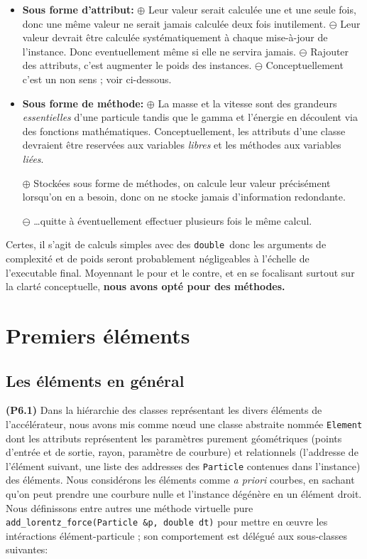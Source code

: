 \documentclass[12pt, letterpaper, twoside]{article}
\newcommand{\T}[1]{\texttt{#1}}
\newcommand{\double}{\texttt{double}}
\begin{document}
\begin{itemize}

\item \textbf{Sous forme d'attribut:}
\subitem $\oplus$ Leur valeur serait calculée une et une seule fois, donc une même valeur ne serait jamais calculée deux fois inutilement.
\subitem $\ominus$ Leur valeur devrait être calculée systématiquement à chaque mise-à-jour de l'instance. Donc eventuellement même si elle ne servira jamais.
\subitem $\ominus$ Rajouter des attributs, c'est augmenter le poids des instances.
\subitem $\ominus$ Conceptuellement c'est un non sens ; voir ci-dessous.

\item \textbf{Sous forme de méthode:}
\subitem $\oplus$ La masse et la vitesse sont des grandeurs \textit{essentielles} d'une particule tandis que le gamma et l'énergie en découlent via des fonctions mathématiques. Conceptuellement, les attributs d'une classe devraient être reservées aux variables \textit{libres} et les méthodes aux variables \textit{liées}.

\subitem $\oplus$ Stockées sous forme de méthodes, on calcule leur valeur précisément lorsqu'on en a besoin, donc on ne stocke jamais d'information redondante.

\subitem $\ominus$ \ldots quitte à éventuellement effectuer plusieurs fois le même calcul.
\end{itemize}
\bigskip
Certes, il s'agit de calculs simples avec des \double\ donc les arguments de complexité et de poids seront probablement négligeables à l'échelle de l'executable final. Moyennant le pour et le contre, et en se focalisant surtout sur la clarté conceptuelle, \textbf{nous avons opté pour des méthodes.}

\section{Premiers éléments}

\subsection{Les éléments en général}
\noindent \textbf{(P6.1)} Dans la hiérarchie des classes représentant les divers éléments de l'accélérateur, nous avons mis comme nœud une classe abstraite nommée \T{Element} dont les attributs représentent les paramètres purement géométriques (points d'entrée et de sortie, rayon, paramètre de courbure) et relationnels (l'addresse de l'élément suivant, une liste des addresses des \T{Particle} contenues dans l'instance) des éléments. Nous considérons les éléments comme \textit{a priori} courbes, en sachant qu'on peut prendre une courbure nulle et l'instance dégénère en un élément droit. Nous définissons entre autres une méthode virtuelle pure \T{add\_lorentz\_force(Particle \&p, double dt)} pour mettre en œuvre les intéractions élément-particule ; son comportement est délégué aux sous-classes suivantes:
\end{document}
